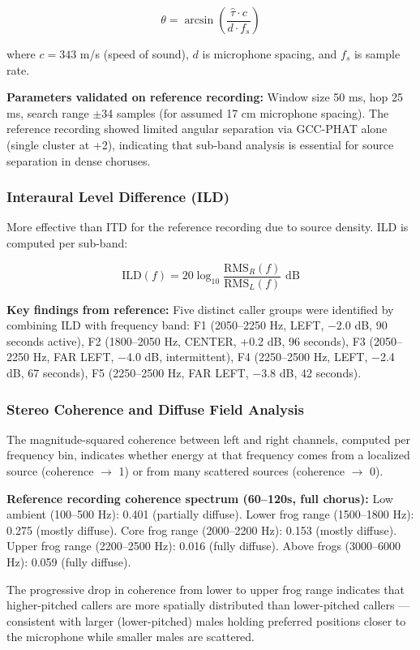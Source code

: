 \documentclass[11pt,letterpaper]{article}
\begin{document}
$$\theta = \arcsin\left(\frac{\hat{\tau} \cdot c}{d \cdot f_s}\right)$$

where $c = 343$ m/s (speed of sound), $d$ is microphone spacing, and $f_s$ is sample rate.

\textbf{Parameters validated on reference recording:} Window size 50 ms, hop 25 ms, search range $\pm$34 samples (for assumed 17 cm microphone spacing). The reference recording showed limited angular separation via GCC-PHAT alone (single cluster at +2\textdegree), indicating that sub-band analysis is essential for source separation in dense choruses.

\subsubsection{Interaural Level Difference (ILD)}

More effective than ITD for the reference recording due to source density. ILD is computed per sub-band:

$$\text{ILD}(f) = 20 \log_{10}\frac{\text{RMS}_R(f)}{\text{RMS}_L(f)} \text{ dB}$$

\textbf{Key findings from reference:} Five distinct caller groups were identified by combining ILD with frequency band: F1 (2050--2250 Hz, LEFT, $-$2.0 dB, 90 seconds active), F2 (1800--2050 Hz, CENTER, +0.2 dB, 96 seconds), F3 (2050--2250 Hz, FAR LEFT, $-$4.0 dB, intermittent), F4 (2250--2500 Hz, LEFT, $-$2.4 dB, 67 seconds), F5 (2250--2500 Hz, FAR LEFT, $-$3.8 dB, 42 seconds).

\subsubsection{Stereo Coherence and Diffuse Field Analysis}

The magnitude-squared coherence between left and right channels, computed per frequency bin, indicates whether energy at that frequency comes from a localized source (coherence $\rightarrow$ 1) or from many scattered sources (coherence $\rightarrow$ 0).

\textbf{Reference recording coherence spectrum (60--120s, full chorus):} Low ambient (100--500 Hz): 0.401 (partially diffuse). Lower frog range (1500--1800 Hz): 0.275 (mostly diffuse). Core frog range (2000--2200 Hz): 0.153 (mostly diffuse). Upper frog range (2200--2500 Hz): 0.016 (fully diffuse). Above frogs (3000--6000 Hz): 0.059 (fully diffuse).

The progressive drop in coherence from lower to upper frog range indicates that higher-pitched callers are more spatially distributed than lower-pitched callers --- consistent with larger (lower-pitched) males holding preferred positions closer to the microphone while smaller males are scattered.
\end{document}
